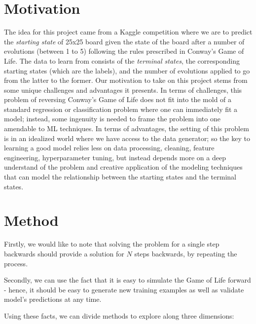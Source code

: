 \documentclass[conference]{IEEEtran}
\begin{document}
\section{Motivation}
The idea for this project came from a Kaggle competition \cite{b1} where we are to predict the {\it starting state} of 25x25 board given the state of the board after a number of evolutions (between 1 to 5) following the rules prescribed in Conway's Game of Life. The data to learn from consists of the {\it terminal states}, the corresponding starting states (which are the labels), and the number of evolutions applied to go from the latter to the former. Our motivation to take on this project stems from some unique challenges and advantages it presents. In terms of challenges, this problem of reversing Conway's Game of Life does not fit into the mold of a standard regression or classification problem where one can immediately fit a model; instead, some ingenuity is needed to frame the problem into one amendable to ML techniques. In terms of advantages, the setting of this problem is in an idealized world where we have access to the data generator; so the key to learning a good model relies less on data processing, cleaning, feature engineering, hyperparameter tuning, but instead depends more on a deep understand of the problem and creative application of the modeling techniques that can model the relationship between the starting states and the terminal states. 

\section{Method}

Firstly, we would like to note that solving the problem for a single step backwards should provide a solution for $N$ steps backwards, by repeating the process.

Secondly, we can use the fact that it is easy to simulate the Game of Life forward - hence, it should be easy to generate new training examples as well as validate model's predictions at any time.

Using these facts, we can divide methods to explore along three dimensions:
\end{document}
